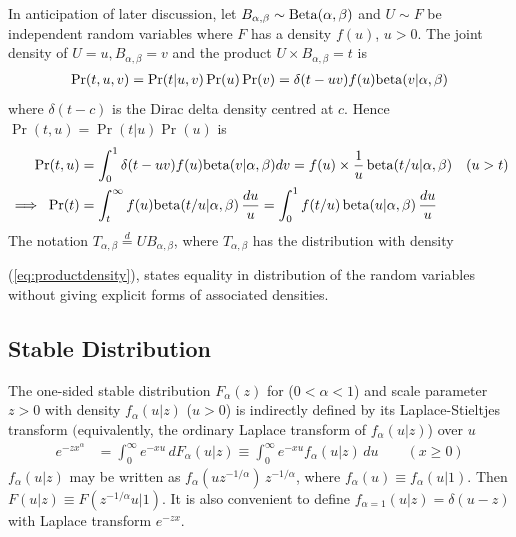\documentclass[a4paper,12pt]{article}
\begin{document}
{%
In anticipation of later discussion,  let  $B_{\alpha,\beta}\sim {\rm Beta}(\alpha,\beta)$ and $U\sim F$ be independent  random variables 
where $F$ has a density $f(u)$, $u>0$.
The joint density of $U=u, B_{\alpha,\beta}=v$ and  the product  $U\times B_{\alpha,\beta}=t$ is
\begin{align*}
\Pr(t, u,v) = \Pr(t\vert u,v) \Pr( u) \Pr(v) = \delta(t-uv) f(u) {\rm beta}(v\vert \alpha,\beta)
\end{align*}
where $\delta(t-c)$ is the Dirac delta density centred at $c$.
Hence $\Pr(t,u)=\Pr(t\vert u)\Pr(u)$ is
\begin{align}
\Pr(t,u) &= \int_0^1 \delta(t-uv) f(u) {\rm beta}(v\vert \alpha,\beta) dv =  f(u) \times \frac{1}{u} \, {\rm beta}(t/u \vert \alpha,\beta) \quad (u>t) 
 \label{eq:jointdensity} \\
\implies \; \Pr(t) &= \int_t^\infty f(u) {\rm beta}(t/u \vert \alpha,\beta) \, \frac{du}{u}
  = \int_0^1 f(t/u) \, {\rm beta}(u\vert \alpha,\beta) \, \frac{du}{u}  %
 \label{eq:productdensity}
\end{align}
The  notation $T_{\alpha,\beta}  \overset{d}{=} U B_{\alpha,\beta}$,
where $T_{\alpha,\beta}$ has  the distribution with density~{(\ref{eq:productdensity}),
 states equality in distribution of the  random variables  without giving explicit forms of  associated densities.

\subsection{Stable Distribution}
\label{sec:stable}

The one-sided  stable distribution $F_\alpha(z)$ for  ($0<\alpha<1$) and scale parameter $z>0$
with density $f_\alpha(u\vert  z)$ ($u>0$) is indirectly defined by   its Laplace-Stieltjes transform 
$($equivalently, the ordinary Laplace transform of  $f_\alpha(u\vert  z)$) over $u$
\begin{align}
e^{-z x^\alpha} &= \int_0^\infty e^{-xu}\,dF_\alpha(u\vert z) \equiv  \int_0^\infty e^{-x u}  f_\alpha(u\vert z)\, du \qquad (x\ge0)
\label{eq:stable} 
\end{align}
$f_\alpha(u\vert z)$ may  be written as $ f_\alpha(u z^{-1/\alpha})\, z^{-1/\alpha}$, 
where $f_\alpha(u)\equiv f_\alpha(u \vert 1)$.
Then  $F(u\vert z) \equiv F(z^{-1/\alpha} u \vert 1)$.
It is also convenient  to define
 $f_{\alpha=1}(u\vert z) = \delta(u-z)$ with Laplace transform $e^{-z x}$.

}}
\end{document}

